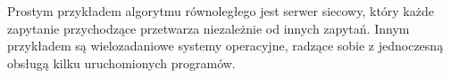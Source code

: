 \begin{przyklad}
Prostym przykładem algorytmu równoległego jest serwer siecowy, który każde zapytanie przychodzące przetwarza niezależnie od innych zapytań. Innym przykładem są wielozadaniowe systemy operacyjne, radzące sobie z jednoczesną obsługą kilku uruchomionych programów.
\end{przyklad}
%
%
%
%

